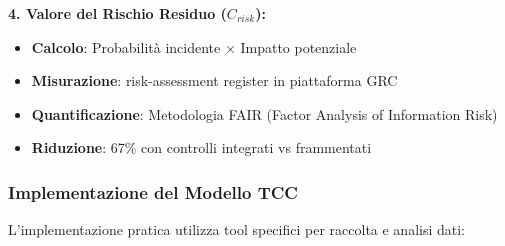 \textbf{4. Valore del Rischio Residuo ($C_{risk}$):}
\begin{itemize}
    \item \textbf{Calcolo}: Probabilità incidente × Impatto potenziale
    \item \textbf{Misurazione}: \gls{risk-assessment} register in piattaforma GRC
    \item \textbf{Quantificazione}: Metodologia FAIR (Factor Analysis of Information Risk)
    \item \textbf{Riduzione}: 67\% con controlli integrati vs frammentati
\end{itemize}

\subsubsection{Implementazione del Modello TCC}

L'implementazione pratica utilizza tool specifici per raccolta e analisi dati:

